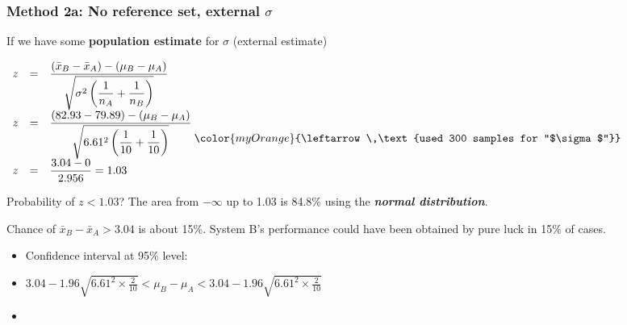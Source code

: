 \begin{frame}\frametitle{Method 2a: No reference set, external $\sigma$}

	If we have some \textbf{population estimate} for $\sigma$ (external estimate)

	$
	\begin{array}{rcl}
		z &=& \dfrac{(\bar{x}_B - \bar{x}_A) - (\mu_B - \mu_A)}{\sqrt{\sigma^2 \left( \dfrac{1}{n_A} + \dfrac{1}{n_B}\right)}} \\
		z &=& \dfrac{(82.93-79.89) - (\mu_B - \mu_A)}{\sqrt{6.61^2 \left( \dfrac{1}{10} + \dfrac{1}{10}\right)}} \genfrac{}{}{0pt}{0}{}{\genfrac{}{}{0pt}{0}{}{{\color{myOrange}{\leftarrow \,\text{used 300 samples for ``$\sigma$''}}}}} \\
		z &=& \dfrac{3.04 - 0}{2.956} = 1.03
	\end{array}
	$

	Probability of $z < 1.03$? The area from $-\infty$ up to 1.03 is 84.8\% using the \textbf{\emph{normal distribution}}.

	Chance of $\bar{x}_B - \bar{x}_A > 3.04$ is about 15\%. System B's performance could have been obtained by pure luck in 15\% of cases.
	\begin{itemize}
		\item	Confidence interval at 95\% level:
		\item	$3.04 - 1.96 \sqrt{6.61^2 \times \frac{2}{10}} < \mu_B - \mu_A < 3.04 - 1.96 \sqrt{6.61^2 \times \frac{2}{10}}$
		\item	{\color{myOrange}{$-2.75 < \mu_B - \mu_A < 8.83$}}
	\end{itemize}
\end{frame}

